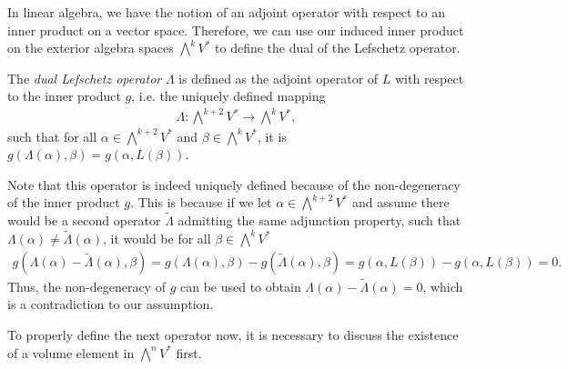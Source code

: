 In linear algebra, we have the notion of an adjoint operator with respect to an inner product on a
vector space. Therefore, we can use our induced inner product on the exterior algebra spaces
$\bigwedge\nolimits^kV^*$ to define the dual of the Lefschetz operator.
\begin{defn}
	The \emph{dual Lefschetz operator} $\Lambda$ is defined as the adjoint operator of $L$ with respect
	to the inner product $g$, i.e. the uniquely defined mapping
	\begin{align*}
		\Lambda: \bigwedge\nolimits^{k+2} V^* \rightarrow \bigwedge\nolimits^{k} V^*,
	\end{align*}
	such that for all $\alpha \in \bigwedge\nolimits^{k+2} V^*$ and $\beta \in \bigwedge\nolimits^{k}V^*$,
	it is $g(\Lambda(\alpha), \beta) = g(\alpha,L(\beta))$.
\end{defn}
\begin{rem}
	Note that this operator is indeed uniquely defined because of the non-degeneracy of the inner
	product $g$. This is because if we let $\alpha \in \bigwedge\nolimits^{k+2} V^*$ and assume there 
	would be a second operator $\widetilde{\Lambda}$ admitting the same adjunction property, such 
	that $\Lambda(\alpha) \neq \widetilde{\Lambda}(\alpha)$, it would be for all 
	$\beta \in \bigwedge\nolimits^k V^*$
	\begin{align*}
		g(\Lambda(\alpha) - \widetilde{\Lambda}(\alpha), \beta) = g\left(\Lambda (\alpha), \beta\right) -
		g(\widetilde{\Lambda}(\alpha),\beta) = g(\alpha, L(\beta)) - g(\alpha, L(\beta)) = 0.
	\end{align*}
	Thus, the non-degeneracy of $g$ can be used to obtain $\Lambda (\alpha)-\widetilde{\Lambda}(\alpha) = 0$,
	which is a contradiction to our assumption.
\end{rem}
To properly define the next operator now, it is necessary to discuss the existence of a volume
element in $\bigwedge^n V^*$ first.
